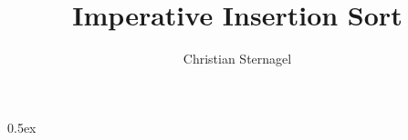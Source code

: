 \documentclass[11pt,a4paper]{article}
\begin{document}
\title{Imperative Insertion Sort}
\author{Christian Sternagel}
\maketitle

\tableofcontents

\parindent 0pt\parskip 0.5ex


\end{document}
